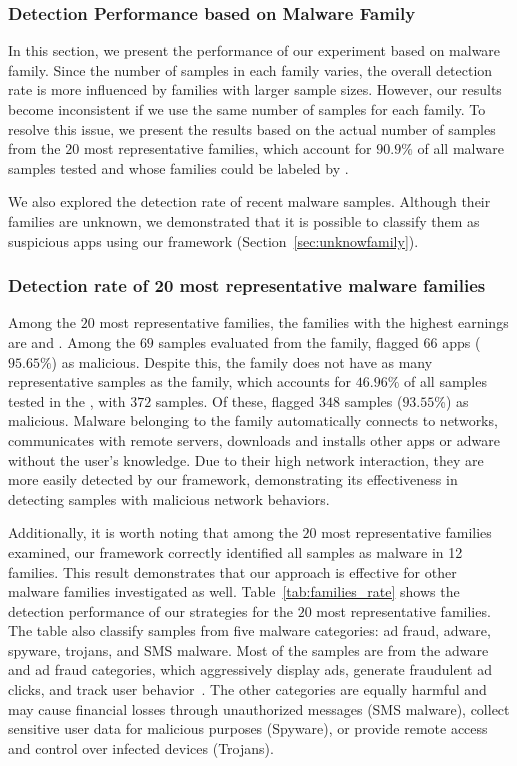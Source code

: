 \subsubsection{Detection Performance based on Malware Family}\label{sec:family-assessment}

In this section, we present the performance of our experiment based on malware family. Since the number of samples in each family varies, the overall detection rate is more influenced by families with larger sample sizes. However, our results become inconsistent if we use the same number of samples for each family. To resolve this issue, we present the results based on the actual number of samples from the $20$ most representative families, which account for $90.9\%$ of all malware samples tested and whose families could be labeled by \vt.

We also explored the detection rate of recent malware samples. Although their families are unknown, we demonstrated that it is possible to classify them as suspicious apps using our framework (Section~\ref{sec:unknowfamily}).


\subsubsection{Detection rate of 20 most representative malware families}\label{sec:familyDetection}


Among the $20$ most representative families, the families with the highest earnings are \gps and \dwg. Among the $69$ samples evaluated from the \dwg family, \droidxpflow flagged $66$ apps ($95.65\%$) as malicious. Despite this, the \dwg family does not have as many representative samples as the \gps family, which accounts for $46.96\%$ of all samples tested in the \fds, with $372$ samples. Of these, \droidxpflow flagged $348$ samples ($93.55$\%) as malicious. Malware belonging to the \gps family automatically connects to networks, communicates with remote servers, downloads and installs other apps or adware without the user’s knowledge\cite{DBLP:journals/jnca/WangCYYPJ19}. Due to their high network interaction, they are more easily detected by our framework, demonstrating its effectiveness in detecting samples with malicious network behaviors.

Additionally, it is worth noting that among the $20$ most representative families examined, our framework correctly identified all samples as malware in 12 families. This result demonstrates that our approach is effective for other malware families investigated as well. Table~\ref{tab:families_rate} shows the detection performance of our strategies for the $20$ most representative families. The table also classify samples from five malware categories: ad fraud, adware, spyware, trojans, and SMS malware. Most of the samples are from the adware and ad fraud categories, which aggressively display ads, generate fraudulent ad clicks, and track user behavior~\cite{DBLP:journals/spe/FallahB22}. The other categories are equally harmful and may cause financial losses through unauthorized messages (SMS malware), collect sensitive user data for malicious purposes (Spyware), or provide remote access and control over infected devices (Trojans).



